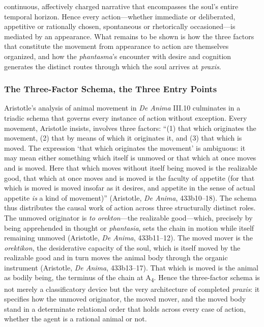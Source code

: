 \documentclass{article}
\begin{document}
continuous, affectively charged narrative that encompasses the soul's entire temporal horizon. Hence every action---whether immediate or deliberated, appetitive or rationally chosen, spontaneous or rhetorically occasioned---is mediated by an appearance. What remains to be shown is how the three factors that constitute the movement from appearance to action are themselves organized, and how the \textit{phantasma}'s encounter with desire and cognition generates the distinct routes through which the soul arrives at \textit{praxis}.


\subsubsection*{The Three-Factor Schema, the Three Entry Points}

Aristotle's analysis of animal movement in \textit{De Anima} III.10 culminates in a triadic schema that governs every instance of action without exception. Every movement, Aristotle insists, involves three factors: ``(1) that which originates the movement, (2) that by means of which it originates it, and (3) that which is moved. The expression `that which originates the movement' is ambiguous: it may mean either something which itself is unmoved or that which at once moves and is moved. Here that which moves without itself being moved is the realizable good, that which at once moves and is moved is the faculty of appetite (for that which is moved is moved insofar as it desires, and appetite in the sense of actual appetite \textit{is} a kind of movement)'' (Aristotle, \textit{De Anima}, 433b10--18). The schema thus distributes the causal work of action across three structurally distinct roles. The unmoved originator is \textit{to orekton}---the realizable good---which, precisely by being apprehended in thought or \textit{phantasia}, sets the chain in motion while itself remaining unmoved (Aristotle, \textit{De Anima}, 433b11--12). The moved mover is the \textit{orektikon}, the desiderative capacity of the soul, which is itself moved by the realizable good and in turn moves the animal body through the organic instrument (Aristotle, \textit{De Anima}, 433b13--17). That which is moved is the animal as bodily being, the terminus of the chain at A\textsubscript{4}. Hence the three-factor schema is not merely a classificatory device but the very architecture of completed \textit{praxis}: it specifies how the unmoved originator, the moved mover, and the moved body stand in a determinate relational order that holds across every case of action, whether the agent is a rational animal or not.
\end{document}

